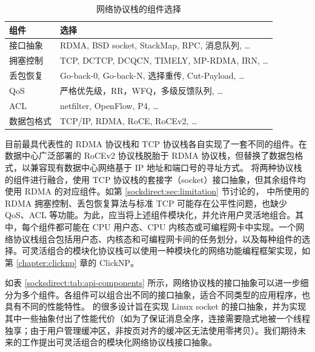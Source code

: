 \begin{table}[htbp]
	\centering
	\caption{网络协议栈的组件选择}
	\small
	\begin{tabular}{l|l}
		\hline
		组件 & 选择 \\
		\hline
		接口抽象 & RDMA, BSD socket, StackMap, RPC, 消息队列, \ldots \\
		拥塞控制 & TCP, DCTCP, DCQCN, TIMELY, MP-RDMA, IRN, \ldots \\
		丢包恢复 & Go-back-0, Go-back-N, 选择重传, Cut-Payload, \ldots \\
		QoS & 严格优先级，RR，WFQ，多级反馈队列, \ldots \\
		ACL & netfilter, OpenFlow, P4, \ldots \\
		数据包格式 & TCP/IP, RDMA, RoCE, RoCEv2, \ldots \\
		\hline
	\end{tabular}
	\label{socksdirect:tab:network-stack-components}
\end{table}

目前最具代表性的 RDMA 协议栈和 TCP 协议栈各自实现了一套不同的组件。在数据中心广泛部署的 RoCEv2 协议栈脱胎于 RDMA 协议栈，但替换了数据包格式，以兼容现有数据中心网络基于 IP 地址和端口号的寻址方式。\sys{} 将两种协议栈的组件进行融合，使用 TCP 协议栈的套接字（socket）接口抽象，但其余组件均使用 RDMA 的对应组件。如第 \ref{sockdirect:sec:limitation} 节讨论的，\sys{} 中所使用的 RDMA 拥塞控制、丢包恢复算法与标准 TCP 可能存在公平性问题，也缺少 QoS、ACL 等功能。为此，应当将上述组件模块化，并允许用户灵活地组合。其中，每个组件都可能在 CPU 用户态、CPU 内核态或可编程网卡中实现。一个网络协议栈组合包括用户态、内核态和可编程网卡间的任务划分，以及每种组件的选择。可灵活组合的模块化协议栈可以使用一种模块化的网络功能编程框架实现，如第 \ref{chapter:clicknp} 章的 ClickNP。

如表 \ref{socksdirect:tab:api-components} 所示，网络协议栈的接口抽象可以进一步细分为多个组件。各组件可以组合出不同的接口抽象，适合不同类型的应用程序，也具有不同的性能特性。\sys{} 的很多设计旨在实现 Linux socket 的接口抽象，并为实现其中一些抽象付出了性能代价（如为了保证消息全序，连接需要隐式地被一个线程独享；由于用户管理缓冲区，非按页对齐的缓冲区无法使用零拷贝）。我们期待未来的工作提出可灵活组合的模块化网络协议栈接口抽象。

